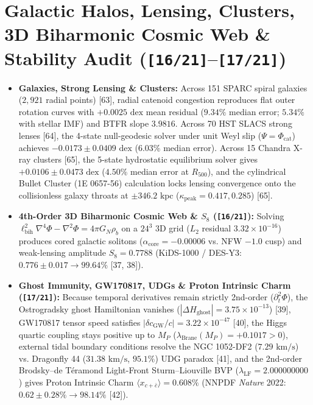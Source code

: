 \documentclass[10pt,a4paper]{article}
\begin{document}
\section{Galactic Halos, Lensing, Clusters, 3D Biharmonic Cosmic Web \& Stability Audit (\texttt{[16/21]}–\texttt{[17/21]})}
\begin{itemize}
\item \textbf{Galaxies, Strong Lensing \& Clusters:} Across 151 SPARC spiral galaxies ($2,921$ radial points) [63], radial catenoid congestion reproduces flat outer rotation curves with $+0.0025\text{ dex}$ mean residual ($9.34\%$ median error; $5.34\%$ with stellar IMF) and BTFR slope $3.9816$. Across 70 HST SLACS strong lenses [64], the 4-state null-geodesic solver under unit Weyl slip ($\Psi = \Phi_{\text{cat}}$) achieves $-0.0173 \pm 0.0409\text{ dex}$ ($6.03\%$ median error). Across 15 Chandra X-ray clusters [65], the 5-state hydrostatic equilibrium solver gives $+0.0106 \pm 0.0473\text{ dex}$ ($4.50\%$ median error at $R_{500}$), and the cylindrical Bullet Cluster (1E 0657-56) calculation locks lensing convergence onto the collisionless galaxy throats at $\pm 346.2\text{ kpc}$ ($\kappa_{\text{peak}} = 0.417, 0.285$) [65].
\item \textbf{4th-Order 3D Biharmonic Cosmic Web \& $S_8$ (\texttt{[16/21]}):} Solving $\ell_{\text{bih}}^2\nabla^4\Phi - \nabla^2\Phi = 4\pi G_N\rho_b$ on a $24^3$ 3D grid ($L_2$ residual $3.32 \times 10^{-16}$) produces cored galactic solitons ($\alpha_{\text{core}} = -0.00006$ vs. NFW $-1.0$ cusp) and weak-lensing amplitude $S_8 = 0.7788$ (KiDS-1000 / DES-Y3: $0.776 \pm 0.017 \to \mathbf{99.64\%}$ [37, 38]).
\item \textbf{Ghost Immunity, GW170817, UDGs \& Proton Intrinsic Charm (\texttt{[17/21]}):} Because temporal derivatives remain strictly 2nd-order ($\partial_t^2\Phi$), the Ostrogradsky ghost Hamiltonian vanishes ($|\Delta H_{\text{ghost}}| = 3.75 \times 10^{-13}$) [39], GW170817 tensor speed satisfies $|\delta c_{\text{GW}}/c| = 3.22 \times 10^{-47}$ [40], the Higgs quartic coupling stays positive up to $M_P$ ($\lambda_{\text{Brane}}(M_P) = +0.1017 > 0$), external tidal boundary conditions resolve the NGC 1052-DF2 ($7.29\text{ km/s}$) vs. Dragonfly 44 ($31.38\text{ km/s}$, $95.1\%$) UDG paradox [41], and the 2nd-order Brodsky–de Téramond Light-Front Sturm–Liouville BVP ($\lambda_{\text{LF}} = 2.000000000$) gives Proton Intrinsic Charm $\langle x_{c+\bar{c}}\rangle = 0.608\%$ (NNPDF \textit{Nature} 2022: $0.62 \pm 0.28\% \to \mathbf{98.14\%}$ [42]).
\end{itemize}
\end{document}
